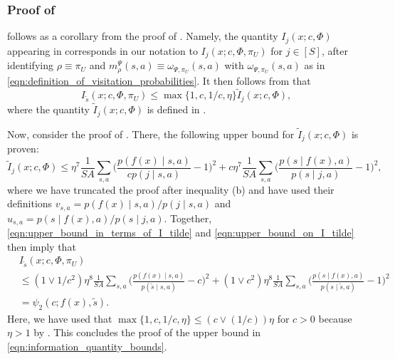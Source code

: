 \documentclass[11pt]{article}
\theoremstyle{definition}
\theoremstyle{definition}
\begin{document}
\subsubsection{Proof of \texorpdfstring{}{lemma}}
\label{sec:proof_of_information_quantity_bounds}

 follows as a corollary from the proof of \cite[Proposition 12]{Jedra:2022}.
Namely, the quantity $I_j(x;c,\Phi)$ appearing in \cite[Eqn.~(35)]{Jedra:2022} corresponds in our notation to $I_{j}(x;c,\Phi,\pi_U)$ for $j\in[S]$, after identifying $\rho \equiv \pi_U$ and $m^{\Psi}_{\rho}(s,a) \equiv \omega_{\Psi,\pi_U}(s,a)$ with $\omega_{\Psi,\pi_U}(s,a)$ as in \eqref{eqn:definition_of_visitation_probabilities}.
It then follows from \cite[Proposition 11]{Jedra:2022} that
\begin{equation}
	\label{eqn:upper_bound_in_terms_of_I_tilde}
	I_{\tilde{s}}(x;c,\Phi,\pi_U)
	\leq
	\max\{1,c,1/c,\eta\}\tilde{I}_j(x;c,\Phi)
	,
\end{equation}
where the quantity $\tilde{I}_j(x;c,\Phi)$ is defined in \cite[Eqn. (37)-(39)]{Jedra:2022}.

Now, consider the proof of \cite[Proposition 12]{Jedra:2022}.
There, the following upper bound for $\tilde{I}_j(x;c,\Phi)$ is proven:
\begin{equation}
	\label{eqn:upper_bound_on_I_tilde}
	\tilde{I}_j(x;c,\Phi)
	\leq
	\eta^7\frac{1}{SA}\sum_{s,a}\biggl(\frac{p(f(x)\mid s,a)}{cp(j\mid s,a)}-1\biggr)^2
	+
	c\eta^7\frac{1}{SA}\sum_{s,a}\biggl(\frac{p(s\mid f(x),a)}{p(s\mid j,a)}-1\biggr)^2,
\end{equation}
where we have truncated the proof after inequality (b) and have used their definitions $v_{s,a} = \allowbreak p(f(x)\mid s,a) / \allowbreak p(j\mid s,a)$ and $u_{s,a} = \allowbreak p(s\mid f(x),a) / \allowbreak p(s\mid j,a)$.
Together, \eqref{eqn:upper_bound_in_terms_of_I_tilde} and \eqref{eqn:upper_bound_on_I_tilde} then imply that
\begin{equation}
	\begin{split}
		 &
		I_{\tilde{s}}(x;c,\Phi,\pi_U)
		\\
		 &
		\leq
		(1\vee 1/c^2)\eta^8\frac{1}{SA}\sum_{s,a}\biggl(\frac{p(f(x)\mid s,a)}{p(\tilde{s}\mid s,a)}-c\biggr)^2
		+
		(1\vee c^2)\eta^8\frac{1}{SA}\sum_{s,a}\biggl(\frac{p(s\mid f(x),a)}{p(s\mid \tilde{s},a)}-1\biggr)^2
		\\
		 &
		=
		\psi_2(c;f(x),\tilde{s}).
	\end{split}
\end{equation}
Here, we have used that $\max\{1,c,1/c,\eta\}\leq (c\vee (1/c))\eta$ for $c>0$ because $\eta>1$ by .
This concludes the proof of the upper bound in \eqref{eqn:information_quantity_bounds}.
\end{document}
